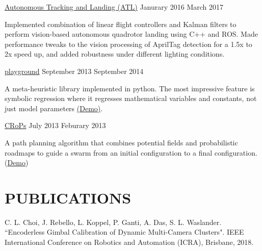 \documentclass[line,margin]{cv}
\begin{document}
\begin{resume}
\href{https://github.com/wavelab/atl}{Autonomous Tracking and Landing (ATL)}
\hfill Janurary 2016 \textemdash{} March 2017

\vspace{0.1em}
\begin{adjustwidth}{2.0em}{2.0em}
  Implemented combination of linear flight controllers and Kalman filters to
  perform vision-based autonomous quadrotor landing using C++ and ROS. Made
  performance tweaks to the vision processing of AprilTag detection for a 1.5x
  to 2x speed up, and added robustness under different lighting conditions.
\end{adjustwidth}


\href{http://chutsu.github.io/playground}{playground}
\hfill September 2013 \textemdash{} September 2014

\vspace{0.1em}
\begin{adjustwidth}{2.0em}{2.0em}
    A meta-heuristic library implemented in python. The most impressive feature
    is symbolic regression where it regresses mathematical variables and
    constants, not just model parameters
    \href{https://www.youtube.com/watch?v=dPjBrLjSBl4}{(Demo)}.
\end{adjustwidth}

\href{https://github.com/wallarelvo/CRoPS}{CRoPs}
\hfill July 2013 \textemdash{} Feburary 2013

\vspace{0.1em}
\begin{adjustwidth}{2.0em}{2.0em}
    A path planning algorithm that combines potential fields and probabilistic
    roadmaps to guide a swarm from an initial configuration to a final
    configuration. (\href{https://www.youtube.com/watch?v=XTZ82zrKzEU}{Demo})
\end{adjustwidth}



\section{PUBLICATIONS}

\begin{adjustwidth}{2.0em}{2.0em}
	C. L. Choi, J. Rebello, L. Koppel, P. Ganti, A. Das, S. L. Waslander.
	``Encoderless Gimbal Calibration of Dynamic Multi-Camera Clusters".
	IEEE International Conference on Robotics and Automation (ICRA),
	Brisbane, 2018.
\end{adjustwidth}




\end{resume}
\end{document}
